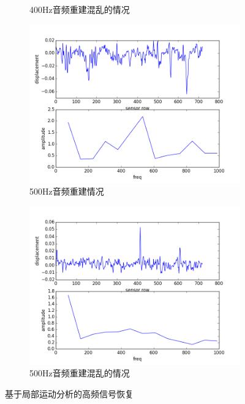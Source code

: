 \begin{figure}[h!]
\begin{center}
\begin{subfigure}[b]{.5\figwidth}
        \caption{400Hz音频重建混乱的情况}
    \end{subfigure}
    \begin{subfigure}[b]{.5\figwidth}
        \includegraphics[width=.5\figwidth]{res/500-0.png}
        \caption{500Hz音频重建情况}
    \end{subfigure}
    \begin{subfigure}[b]{.5\figwidth}
        \includegraphics[width=.5\figwidth]{res/500-1.png}
        \caption{500Hz音频重建混乱的情况}
    \end{subfigure}
    \caption{基于局部运动分析的高频信号恢复}
    \label{fig:real:highfreq}
\end{center}\end{figure}


